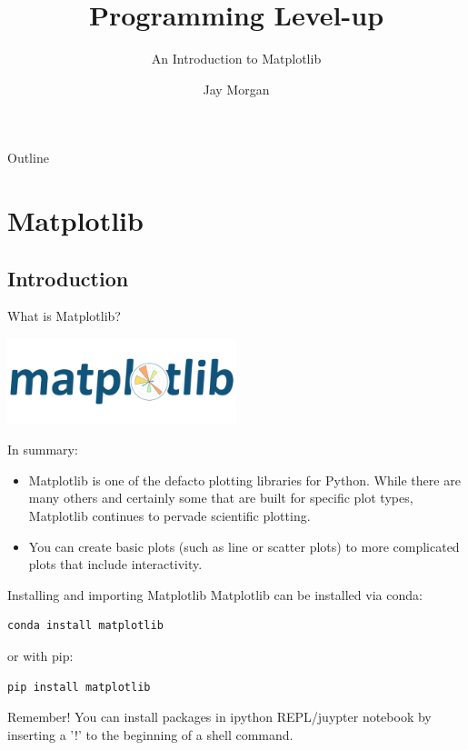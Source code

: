 \documentclass[10pt]{beamer}
\author{Jay Morgan}
\date{}
\title{Programming Level-up}
\subtitle{An Introduction to Matplotlib}
\begin{document}
\maketitle
\begin{frame}{Outline}
\tableofcontents
\end{frame}


\section{Matplotlib}
\label{sec:orge08e111}

\subsection{Introduction}
\label{sec:org84b313b}

\begin{frame}[label={sec:org4499385}]{What is Matplotlib?}
\begin{center}
\includegraphics[width=0.5\textwidth]{images/matlogo.png}
\end{center}

In summary:
\begin{itemize}
\item Matplotlib is one of the defacto plotting libraries for Python. While there
are many others and certainly some that are built for specific plot types,
Matplotlib continues to pervade scientific plotting.
\item You can create basic plots (such as line or scatter plots) to more complicated
plots that include interactivity.
\end{itemize}
\end{frame}

\begin{frame}[label={sec:org024c4b0},fragile]{Installing and importing Matplotlib}
 Matplotlib can be installed via conda:

\begin{verbatim}
conda install matplotlib
\end{verbatim}

or with pip:

\begin{verbatim}
pip install matplotlib
\end{verbatim}

Remember! You can install packages in ipython REPL/juypter notebook by
inserting a '!' to the beginning of a shell command.
\end{frame}
\end{document}
